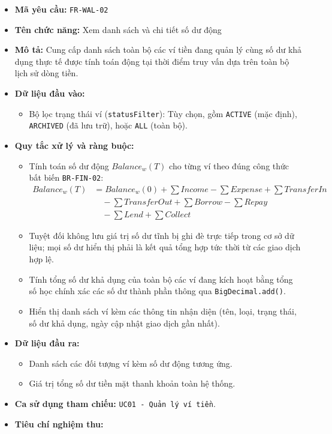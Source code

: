 \documentclass[11pt,a4paper]{article}
\providecommand{\tightlist}{
  \setlength{\itemsep}{0pt}\setlength{\parskip}{0pt}}
\begin{document}
\begin{itemize}
\tightlist
\item
  \textbf{Mã yêu cầu:} \texttt{FR-WAL-02}
\item
  \textbf{Tên chức năng:} Xem danh sách và chi tiết số dư động
\item
  \textbf{Mô tả:} Cung cấp danh sách toàn bộ các ví tiền đang quản lý
  cùng số dư khả dụng thực tế được tính toán động tại thời điểm truy vấn
  dựa trên toàn bộ lịch sử dòng tiền.
\item
  \textbf{Dữ liệu đầu vào:}

  \begin{itemize}
  \tightlist
  \item
    Bộ lọc trạng thái ví (\texttt{statusFilter}): Tùy chọn, gồm
    \texttt{ACTIVE} (mặc định), \texttt{ARCHIVED} (đã lưu trữ), hoặc
    \texttt{ALL} (toàn bộ).
  \end{itemize}
\item
  \textbf{Quy tắc xử lý và ràng buộc:}

  \begin{itemize}
  \tightlist
  \item
    Tính toán số dư động \(Balance_w(T)\) cho từng ví theo đúng công
    thức bất biến \texttt{BR-FIN-02}:
    \[
    \begin{aligned}
    Balance_w(T) &= Balance_w(0) + \sum Income - \sum Expense + \sum TransferIn \\
    &\quad - \sum TransferOut + \sum Borrow - \sum Repay \\
    &\quad - \sum Lend + \sum Collect
    \end{aligned}
    \]
  \item
    Tuyệt đối không lưu giá trị số dư tĩnh bị ghi đè trực tiếp trong cơ
    sở dữ liệu; mọi số dư hiển thị phải là kết quả tổng hợp tức thời từ
    các giao dịch hợp lệ.
  \item
    Tính tổng số dư khả dụng của toàn bộ các ví đang kích hoạt bằng tổng
    số học chính xác các số dư thành phần thông qua
    \texttt{BigDecimal.add()}.
  \item
    Hiển thị danh sách ví kèm các thông tin nhận diện (tên, loại, trạng
    thái, số dư khả dụng, ngày cập nhật giao dịch gần nhất).
  \end{itemize}
\item
  \textbf{Dữ liệu đầu ra:}

  \begin{itemize}
  \tightlist
  \item
    Danh sách các đối tượng ví kèm số dư động tương ứng.
  \item
    Giá trị tổng số dư tiền mặt thanh khoản toàn hệ thống.
  \end{itemize}
\item
  \textbf{Ca sử dụng tham chiếu:} \texttt{UC01\ -\ Quản\ lý\ ví\ tiền}.
\item
  \textbf{Tiêu chí nghiệm thu:}


\end{itemize}
\end{document}
